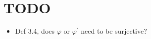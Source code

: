 \section{TODO}\par
\begin{itemize}
  \item Def 3.4, does $\varphi$ or $\varphi^{\prime}$ need to be surjective?
\end{itemize}

